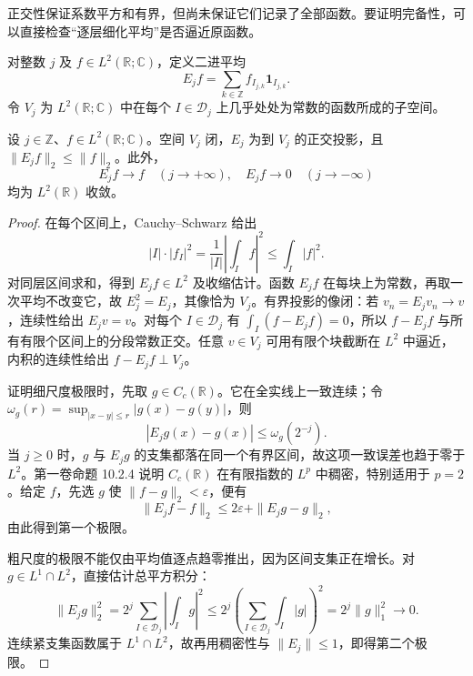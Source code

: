正交性保证系数平方和有界，但尚未保证它们记录了全部函数。要证明完备性，可以直接检查“逐层细化平均”是否逼近原函数。

\begin{definition}\label{b2:def:19-haar-averaging}
对整数 \(j\) 及 \(f\in L^2(\mathbb R;\mathbb C)\)，定义二进平均
\begin{equation}\label{b2:eq:19-haar-averaging}
 E_jf=\sum_{k\in\mathbb Z}f_{I_{j,k}}\mathbf1_{I_{j,k}}.
\end{equation}
令 \(V_j\) 为 \(L^2(\mathbb R;\mathbb C)\) 中在每个 \(I\in\mathcal D_j\) 上几乎处处为常数的函数所成的子空间。
\end{definition}

\begin{lemma}[平均投影的两个极限]\label{b2:lem:19-haar-averaging-limits}
设 \(j\in\mathbb Z\)、\(f\in L^2(\mathbb R;\mathbb C)\)。空间 \(V_j\) 闭，\(E_j\) 为到 \(V_j\) 的正交投影，且 \(\|E_jf\|_2\leq\|f\|_2\)。此外，
\begin{equation}\label{b2:eq:19-haar-two-limits}
 E_jf\longrightarrow f\quad(j\to+\infty),
 \quad E_jf\longrightarrow0\quad(j\to-\infty)
\end{equation}
均为 \(L^2(\mathbb R)\) 收敛。
\end{lemma}
\begin{proof}
在每个区间上，Cauchy--Schwarz 给出
\[
 |I|\cdot|f_I|^2
 =\frac1{|I|}\left|\int_If\right|^2
 \leq\int_I|f|^2.
\]
对同层区间求和，得到 \(E_jf\in L^2\) 及收缩估计。函数 \(E_jf\) 在每块上为常数，再取一次平均不改变它，故 \(E_j^2=E_j\)，其像恰为 \(V_j\)。有界投影的像闭：若 \(v_n=E_jv_n\to v\)，连续性给出 \(E_jv=v\)。对每个 \(I\in\mathcal D_j\) 有 \(\int_I(f-E_jf)=0\)，所以 \(f-E_jf\) 与所有有限个区间上的分段常数正交。任意 \(v\in V_j\) 可用有限个块截断在 \(L^2\) 中逼近，内积的连续性给出 \(f-E_jf\perp V_j\)。

证明细尺度极限时，先取 \(g\in C_c(\mathbb R)\)。它在全实线上一致连续；令
\(\omega_g(r)=\sup_{|x-y|\leq r}|g(x)-g(y)|\)，则
\[
 |E_jg(x)-g(x)|\leq\omega_g(2^{-j}).
\]
当 \(j\geq0\) 时，\(g\) 与 \(E_jg\) 的支集都落在同一个有界区间，故这项一致误差也趋于零于 \(L^2\)。第一卷命题 10.2.4 说明 \(C_c(\mathbb R)\) 在有限指数的 \(L^p\) 中稠密，特别适用于 \(p=2\)。给定 \(f\)，先选 \(g\) 使 \(\|f-g\|_2<\varepsilon\)，便有
\[
 \|E_jf-f\|_2\leq2\varepsilon+\|E_jg-g\|_2,
\]
由此得到第一个极限。

粗尺度的极限不能仅由平均值逐点趋零推出，因为区间支集正在增长。对 \(g\in L^1\cap L^2\)，直接估计总平方积分：
\[
 \|E_jg\|_2^2
 =2^j\sum_{I\in\mathcal D_j}\left|\int_Ig\right|^2
 \leq2^j\left(\sum_{I\in\mathcal D_j}\int_I|g|\right)^2
 =2^j\|g\|_1^2\longrightarrow0.
\]
连续紧支集函数属于 \(L^1\cap L^2\)，故再用稠密性与 \(\|E_j\|\leq1\)，即得第二个极限。
\end{proof}

